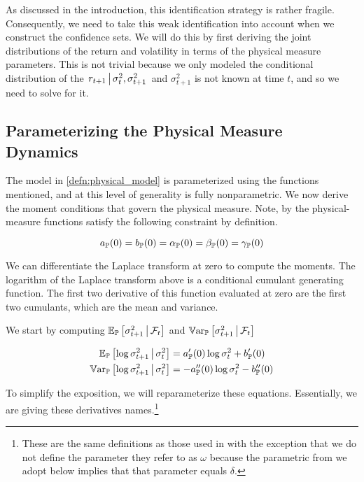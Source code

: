 \documentclass[11pt, letterpaper, twoside, final]{article}
\begin{document}
As discussed in the introduction, this identification strategy is rather fragile.
Consequently, we need to take this weak identification into account when we construct the confidence sets.
We will do this by first deriving the joint distributions of the return and volatility in terms of the physical
measure parameters.
This is not trivial because we only modeled the conditional distribution of the $\left. r_{t+1} \,\middle\vert\, \sigma^2_{t},
\sigma^2_{t+1} \right.$  and $\sigma^2_{t+1}$ is not known at time $t$, and so we need to solve for it.


\subsection{Parameterizing the Physical Measure Dynamics}

The model in \cref{defn:physical_model} is parameterized using the functions mentioned, and at this level of
generality is fully nonparametric. 
We now derive the moment conditions that govern the physical measure. 
Note, by the physical-measure functions satisfy the following constraint by definition.

\begin{equation}
    a_{\mathbb{P}}(0) = b_{\mathbb{P}}(0) = \alpha_{\mathbb{P}}(0) = \beta_{\mathbb{P}}(0) = \gamma_{\mathbb{P}}(0) 
\end{equation}

We can differentiate the Laplace transform at zero to compute the moments.
The logarithm of the Laplace transform above is a conditional cumulant generating function.
The first two derivative of this function evaluated at zero are the first two cumulants, which are the mean and
variance. 

We start by computing $\operatorname{\mathbb{E}}_{\mathbb{P}}\left[\sigma^2_{t+1} \,\middle\vert\, \mathcal{F}_t\right]$ and $\operatorname{\mathbb{V}ar}_{\mathbb{P}}\left[\sigma^2_{t+1} \,\middle\vert\,
\mathcal{F}_t\right]$


\begin{align}
    \operatorname{\mathbb{E}}_{\mathbb{P}}\left[\log \sigma^2_{t+1} \,\middle\vert\, \sigma^2_t \right]  &= a_{\mathbb{P}}'(0) \log \sigma^2_t  + b_{\mathbb{P}}'(0) \\
    \operatorname{\mathbb{V}ar}_{\mathbb{P}}\left[\log \sigma^2_{t+1} \,\middle\vert\, \sigma^2_t \right]  &= -a_{\mathbb{P}}''(0) \log \sigma^2_t  - b_{\mathbb{P}}''(0) 
\end{align}

To simplify the exposition, we will reparameterize these equations. 
Essentially, we are giving these derivatives names.\footnote{These are the same definitions as those used in
\textcite{khrapov2016affine} with the exception that we do not define the parameter they refer to as $\omega$
because the parametric from we adopt below implies that that parameter equals $\delta$.}
\end{document}

